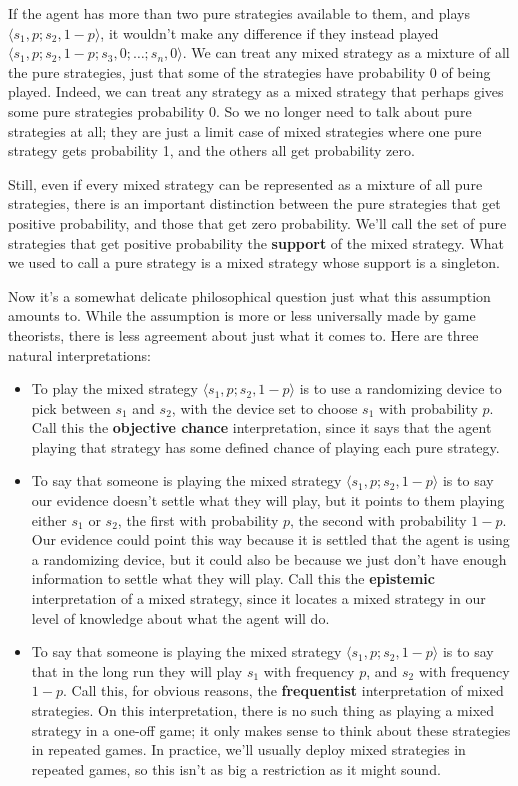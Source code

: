 \documentclass[openany]{book}
\begin{document}
If the agent has more than two pure strategies available to them, and plays $\langle s_1, p; s_2, 1-p \rangle$, it wouldn't make any difference if they instead played $\langle s_1, p; s_2, 1-p; s_3, 0; \dots; s_n, 0\rangle$. We can treat any mixed strategy as a mixture of all the pure strategies, just that some of the strategies have probability 0 of being played. Indeed, we can treat any strategy as a mixed strategy that perhaps gives some pure strategies probability 0. So we no longer need to talk about pure strategies at all; they are just a limit case of mixed strategies where one pure strategy gets probability 1, and the others all get probability zero.

Still, even if every mixed strategy can be represented as a mixture of all pure strategies, there is an important distinction between the pure strategies that get positive probability, and those that get zero probability. We'll call the set of pure strategies that get positive probability the \textbf{support} of the mixed strategy. What we used to call a pure strategy is a mixed strategy whose support is a singleton.

Now it's a somewhat delicate philosophical question just what this assumption amounts to. While the assumption is more or less universally made by game theorists, there is less agreement about just what it comes to. Here are three natural interpretations:

\begin{itemize}
\item To play the mixed strategy $\langle s_1, p; s_2, 1-p \rangle$ is to use a randomizing device to pick between $s_1$ and $s_2$, with the device set to choose $s_1$ with probability $p$. Call this the \textbf{objective chance} interpretation, since it says that the agent playing that strategy has some defined chance of playing each pure strategy.
\item To say that someone is playing the mixed strategy $\langle s_1, p; s_2, 1-p \rangle$ is to say our evidence doesn't settle what they will play, but it points to them playing either $s_1$ or $s_2$, the first with probability $p$, the second with probability $1-p$. Our evidence could point this way because it is settled that the agent is using a randomizing device, but it could also be because we just don't have enough information to settle what they will play. Call this the \textbf{epistemic} interpretation of a mixed strategy, since it locates a mixed strategy in our level of knowledge about what the agent will do.
\item To say that  someone is playing the mixed strategy $\langle s_1, p; s_2, 1-p \rangle$ is to say that in the long run they will play $s_1$ with frequency $p$, and $s_2$ with frequency $1-p$. Call this, for obvious reasons, the \textbf{frequentist} interpretation of mixed strategies. On this interpretation, there is no such thing as playing a mixed strategy in a one-off game; it only makes sense to think about these strategies in repeated games. In practice, we'll usually deploy mixed strategies in repeated games, so this isn't as big a restriction as it might sound.
\end{itemize}
\end{document}
